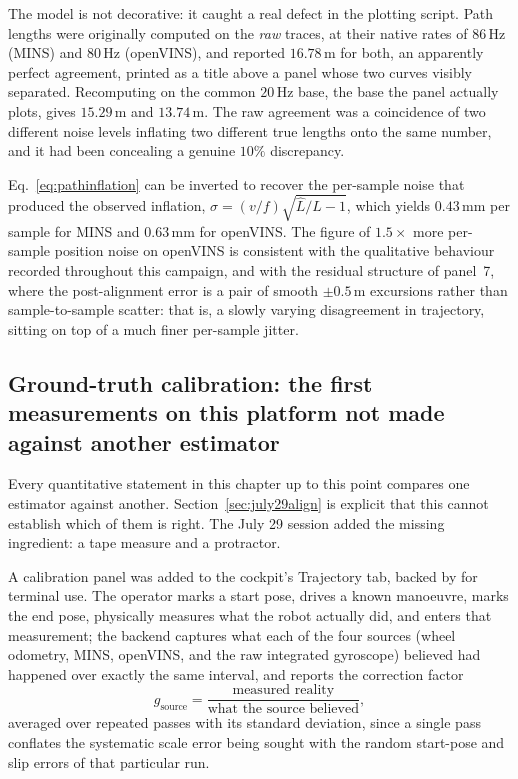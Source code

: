 The model is not decorative: it caught a real defect in the plotting script.
Path lengths were originally computed on the \emph{raw} traces, at their
native rates of $86$\,Hz (MINS) and $80$\,Hz (openVINS), and reported
$16.78$\,m for both, an apparently perfect agreement, printed as a title
above a panel whose two curves visibly separated. Recomputing on the common
$20$\,Hz base, the base the panel actually plots, gives $15.29$\,m and
$13.74$\,m. The raw agreement was a coincidence of two different noise
levels inflating two different true lengths onto the same number, and it had
been concealing a genuine $10\%$ discrepancy.

Eq.~\ref{eq:pathinflation} can be inverted to recover the per-sample noise
that produced the observed inflation, $\sigma=(v/f)\sqrt{\hat L/L-1}$, which
yields $0.43$\,mm per sample for MINS and $0.63$\,mm for openVINS. The
figure of $1.5\times$ more per-sample position noise on openVINS is
consistent with the qualitative behaviour recorded throughout this campaign,
and with the residual structure of panel~7, where the post-alignment error
is a pair of smooth $\pm0.5$\,m excursions rather than sample-to-sample
scatter: that is, a slowly varying disagreement in trajectory, sitting on
top of a much finer per-sample jitter.

\subsection{Ground-truth calibration: the first measurements on this
platform not made against another estimator}
\label{sec:july29calib}
Every quantitative statement in this chapter up to this point compares one
estimator against another. Section~\ref{sec:july29align} is explicit that
this cannot establish which of them is right. The July 29 session added the
missing ingredient: a tape measure and a protractor.

A calibration panel was added to the cockpit's Trajectory tab, backed by
 for terminal use. The operator marks a start
pose, drives a known manoeuvre, marks the end pose, physically measures what
the robot actually did, and enters that measurement; the backend captures
what each of the four sources (wheel odometry, MINS, openVINS, and the
raw integrated gyroscope) believed had happened over exactly the same
interval, and reports the correction factor
\begin{equation}
g_{\text{source}}=\frac{\text{measured reality}}{\text{what the source believed}},
\label{eq:calibfactor}
\end{equation}
averaged over repeated passes with its standard deviation, since a single
pass conflates the systematic scale error being sought with the random
start-pose and slip errors of that particular run.

